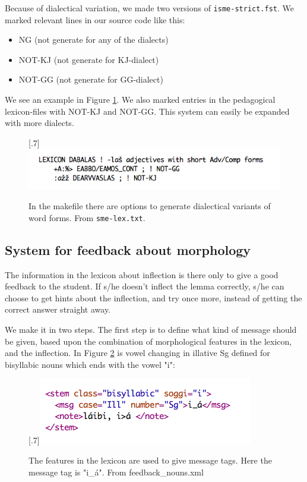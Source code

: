 \documentclass[a4paper,12pt]{article}
\begin{document}
Because of dialectical variation, we made two versions of \texttt{isme-strict.fst}. We marked relevant lines in our source code like this:
\begin {itemize}
\item NG (not generate for any of the dialects)
\item NOT-KJ (not generate for KJ-dialect) 
\item NOT-GG (not generate for GG-dialect)  
\end {itemize}

We see an example in Figure \ref{smelex}. We also marked entries in the pedagogical lexicon-files with NOT-KJ and NOT-GG. This system can easily be expanded with more dialects.


\begin{figure}[htbp]
\begin{center}
\scalebox{.7}[.7]{\includegraphics{img/smelex.png}}\\
\caption{In the makefile there are options to generate dialectical variants of word forms. From \texttt{sme-lex.txt}.}
\label{smelex}
\end{center}
\end{figure}


\subsection{System for feedback about morphology}

The information in the lexicon about inflection is there only to give a good feedback to the student. If s/he doesn't inflect the lemma correctly, s/he can choose to get hints about the inflection, and try once more, instead of getting the correct answer straight away. 

We make it in two steps. The first step is to define what kind of message should be given, based upon the combination of morphological features in the lexicon, and the inflection. In Figure \ref{feedbacknouns} is vowel changing in illative Sg defined for bisyllabic nouns which ends with the vowel "i":


\begin{figure}[htbp]
\begin{center}
\scalebox{.7}[.7]{\includegraphics{img/feedback_nouns.png}}\\
\caption{The features in the lexicon are used to give message tags. Here the message tag is "i\_á". From feedback\_nouns.xml}
\label{feedbacknouns}
\end{center}
\end{figure}
\end{document}

